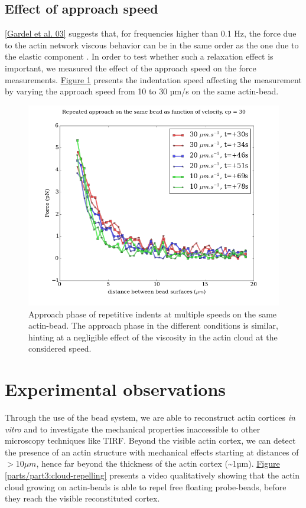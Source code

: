 \documentclass[A4paperpaper,11pt,english]{sphinxmanual}
\begin{document}
\subsection{Effect of approach speed}
\label{parts/part3:effect-of-approach-speed}
{\hyperref[parts/part3:gardel2003]{{[}Gardel et al. 03{]}}} suggests that, for frequencies higher than 0.1 Hz, the force due to
the actin network viscous behavior can be in the same order as the one due to the elastic
component . In order to test whether such a relaxation effect is important, we measured the effect of the
approach speed on the force measurements. \hyperref[parts/part3:many-speed]{Figure  \ref*{parts/part3:many-speed}} presents the
indentation speed affecting the measurement by varying the approach speed from 10
to 30 µm/s on the same actin-bead.
\begin{figure}[htbp]
\centering
\capstart

\includegraphics[width=0.600\linewidth]{many_speed.png}
\caption{Approach phase of repetitive indents at multiple speeds on the same
actin-bead. The approach phase in the different conditions is similar,
hinting at  a negligible effect of the viscosity  in the actin cloud at the
considered speed.}\label{parts/part3:many-speed}\end{figure}


\section{Experimental observations}
\label{parts/part3:experimental-observations}
Through the use of the bead system, we are able to reconstruct actin cortices \emph{in vitro} and
to investigate the mechanical properties inaccessible to other microscopy
techniques like TIRF. Beyond the visible actin cortex, we can detect the
presence of an actin structure with mechanical effects starting at
distances of \(> 10\mu{}m\), hence far beyond the thickness of the actin cortex (\textasciitilde{}1µm).
\hyperref[parts/part3:cloud-repelling]{Figure  \ref*{parts/part3:cloud-repelling}} presents a video qualitatively showing that the actin cloud growing
on actin-beads is able to repel free floating probe-beads, before they reach the
visible reconstituted cortex.
\end{document}
